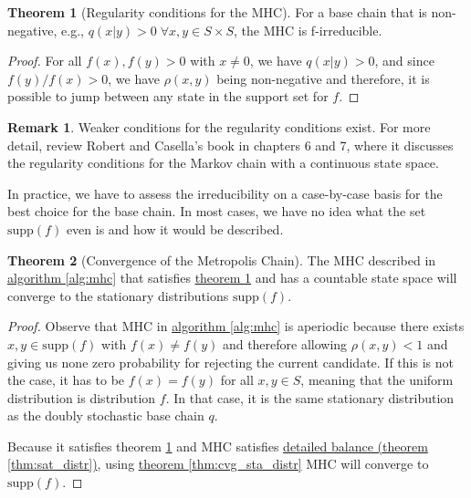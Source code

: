 \documentclass[]{article}
\theoremstyle{definition}
\newtheorem{theorem}{Theorem}       %
\newtheorem{remark}{Remark}[subsection]
{
    \newtheorem{assumption}{Assumption}
}
\begin{document}
        \begin{theorem}[Regularity conditions for the MHC]\label{thm:reg_cond}
            For a base chain that is non-negative, e.g., $q(x|y) > 0\; \forall x, y\in S\times S$, the MHC is f-irreducible. 
        \end{theorem}
        \begin{proof}
            For all $f(x),f(y)>0$ with $x\neq 0$, we have $q(x|y) > 0$, and since $f(y)/f(x) > 0$, we have $\rho(x,y)$ being non-negative and therefore, it is possible to jump between any state in the support set for $f$. 
        \end{proof}
        \begin{remark}
            Weaker conditions for the regularity conditions exist. For more detail, review Robert and Casella's book \cite{book:robert_casella_2005} in chapters 6 and 7, where it discusses the regularity conditions for the Markov chain with a continuous state space. 
            \par
            In practice, we have to assess the irreducibility on a case-by-case basis for the best choice for the base chain. In most cases, we have no idea what the set $\text{supp}(f)$ even is and how it would be described. 
        \end{remark}
        \begin{theorem}[Convergence of the Metropolis Chain]
            The MHC described in \hyperref[alg:mhc]{algorithm \ref*{alg:mhc}} that satisfies \hyperref[thm:reg_cond]{theorem \ref*{thm:reg_cond}} and has a countable state space will converge to the stationary distributions $\text{supp}(f)$. 
        \end{theorem}
        \begin{proof}
            Observe that MHC in \hyperref[alg:mhc]{algorithm \ref*{alg:mhc}} is aperiodic because there exists $x, y\in \text{supp}(f)$ with $f(x) \neq f(y)$ and therefore allowing $\rho(x, y) < 1$ and giving us none zero probability for rejecting the current candidate. If this is not the case, it has to be $f(x) = f(y)$ for all $x, y \in S$, meaning that the uniform distribution is distribution $f$. In that case, it is the same stationary distribution as the doubly stochastic base chain $q$. 
            \par
            Because it satisfies theorem \ref*{thm:reg_cond} and MHC satisfies \hyperref[thm:sat_distr]{detailed balance (theorem \ref*{thm:sat_distr})}, using \hyperref[thm:cvg_sta_distr]{theorem \ref*{thm:cvg_sta_distr}} MHC will converge to $\text{supp}(f)$. 
        \end{proof}
\end{document}
